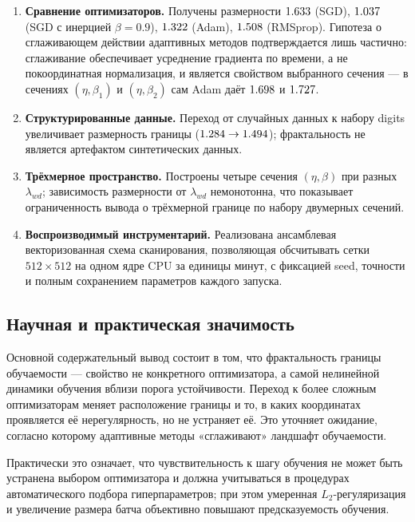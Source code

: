 \begin{enumerate}[leftmargin=*,topsep=2pt,itemsep=3pt]
        границу ($\DEtaWd$ против $\DSgd$ при том же разрешении), уменьшение
        размера батча --- увеличивает изрезанность монотонно:
        $\DMbFull$, $\DMbFour$, $\DMbOne$ при $B=32,4,1$.
  \item \textbf{Сравнение оптимизаторов.} Получены размерности $\DSgd$ (SGD),
        $1.037$ (SGD с инерцией $\beta=0.9$), $1.322$ (Adam),
        $1.508$ (RMSprop). Гипотеза о сглаживающем действии адаптивных
        методов подтверждается лишь частично: сглаживание обеспечивает
        усреднение градиента по времени, а не покоординатная нормализация, и
        является свойством выбранного сечения --- в сечениях $(\eta,\beta_1)$
        и $(\eta,\beta_2)$ сам Adam даёт $1.698$ и $1.727$.
  \item \textbf{Структурированные данные.} Переход от случайных данных к набору
        digits увеличивает размерность границы ($1.284 \to 1.494$);
        фрактальность не является артефактом синтетических данных.
  \item \textbf{Трёхмерное пространство.} Построены четыре сечения
        $(\eta,\beta)$ при разных $\lambda_{wd}$; зависимость размерности от
        $\lambda_{wd}$ немонотонна, что показывает ограниченность вывода о
        трёхмерной границе по набору двумерных сечений.
  \item \textbf{Воспроизводимый инструментарий.} Реализована ансамблевая
        векторизованная схема сканирования, позволяющая обсчитывать сетки
        $512\times512$ на одном ядре CPU за единицы минут, с фиксацией seed,
        точности и полным сохранением параметров каждого запуска.
\end{enumerate}

\subsection{Научная и практическая значимость}

Основной содержательный вывод состоит в том, что фрактальность границы
обучаемости --- свойство не конкретного оптимизатора, а самой нелинейной
динамики обучения вблизи порога устойчивости. Переход к более сложным
оптимизаторам меняет расположение границы и то, в каких координатах
проявляется её нерегулярность, но не устраняет её. Это уточняет ожидание,
согласно которому адаптивные методы «сглаживают» ландшафт обучаемости.

Практически это означает, что чувствительность к шагу обучения не может быть
устранена выбором оптимизатора и должна учитываться в процедурах
автоматического подбора гиперпараметров; при этом умеренная $L_2$-регуляризация
и увеличение размера батча объективно повышают предсказуемость обучения.

